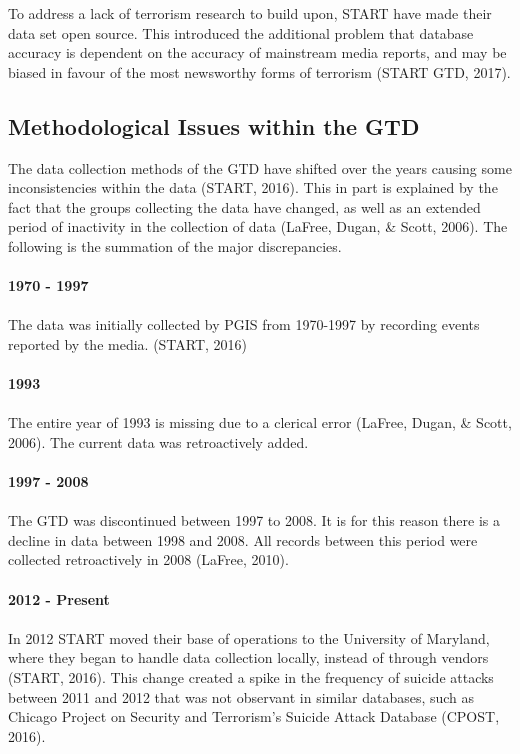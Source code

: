 \documentclass[10pt,a4paper]{article}
\begin{document}
To address a lack of terrorism research to build upon, START have made their data set open source. This introduced the additional problem that database accuracy is dependent on the accuracy of mainstream media reports, and may be biased in favour of the most newsworthy forms of terrorism (START GTD, 2017).

\subsection{Methodological Issues within the GTD}

The data collection methods of the GTD have shifted over the years causing some inconsistencies within the data (START, 2016). This in part is explained by the fact that the groups collecting the data have changed, as well as an extended period of inactivity in the collection of data (LaFree, Dugan, \& Scott, 2006). The following is the summation of the major discrepancies.
\\\\

\textbf{1970 - 1997 }\\\\
The data was initially collected by PGIS from 1970-1997 by recording events reported by the media. (START, 2016)\\\\

\textbf{1993}\\\\
The entire year of 1993 is missing due to a clerical error (LaFree, Dugan, \& Scott, 2006). The current data was retroactively added.
\\\\

\textbf{1997 - 2008}\\\\
The GTD was discontinued between 1997 to 2008. It is for this reason there is a decline in data between 1998 and 2008. All records between this period were collected retroactively in 2008 (LaFree, 2010).
\\\\

\textbf{2012 - Present}\\\\
In 2012 START moved their base of operations to the University of Maryland, where they began to handle data collection locally, instead of through vendors (START, 2016). This change created a spike in the frequency of suicide attacks between 2011 and 2012 that was not observant in similar databases, such as Chicago Project on Security and Terrorism’s Suicide Attack Database (CPOST, 2016).
\\\\
\end{document}
